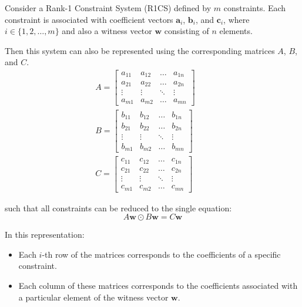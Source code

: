 \documentclass[../lecture-notes.tex]{subfiles}
\begin{document}
\begin{theorem} 
    Consider a Rank-1 Constraint System (R1CS) defined by $m$ constraints. Each constraint is
    associated with coefficient vectors $\mathbf{a}_i$, $\mathbf{b}_i$, and $\mathbf{c}_i$, where $i \in \{1, 2, \dots, m\}$ and
    also a witness vector $\mathbf{w}$ consisting of $n$ elements.

    Then this system can also be represented using the corresponding matrices $A$, $B$, and $C$.
    \begin{align*}
        A = \begin{bmatrix}
            a_{11} & a_{12} & \dots & a_{1n} \\
            a_{21} & a_{22} & \dots & a_{2n} \\
            \vdots & \vdots & \ddots & \vdots \\
            a_{m1} & a_{m2} & \dots & a_{mn}
        \end{bmatrix} & \quad \\
        B = \begin{bmatrix}
            b_{11} & b_{12} & \dots & b_{1n} \\
            b_{21} & b_{22} & \dots & b_{2n} \\
            \vdots & \vdots & \ddots & \vdots \\
            b_{m1} & b_{m2} & \dots & b_{mn}
        \end{bmatrix} & \\
        C = \begin{bmatrix}
            c_{11} & c_{12} & \dots & c_{1n} \\
            c_{21} & c_{22} & \dots & c_{2n} \\
            \vdots & \vdots & \ddots & \vdots \\
            c_{m1} & c_{m2} & \dots & c_{mn}
        \end{bmatrix}
    \end{align*}

    such that all constraints can be reduced to the single equation:
    \begin{equation*}
        A\mathbf{w} \odot B\mathbf{w} = C\mathbf{w}
    \end{equation*}
    
    In this representation:
    \begin{itemize}
        \item Each $i$-th row of the matrices corresponds to the coefficients of a specific constraint.
        \item Each column of these matrices corresponds to the coefficients associated with a 
        particular element of the witness vector $\mathbf{w}$.
    \end{itemize}
\end{theorem}
\end{document}
